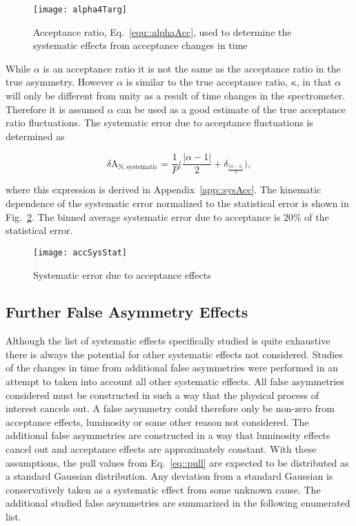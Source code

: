 \begin{figure}[h!t]
  \begin{center}
    \texttt{[image: alpha4Targ]}
    \caption{Acceptance ratio, Eq.~\ref{equ::alphaAcc}, used to determine the
      systematic effects from acceptance changes in time}
    \label{fig::alpha}
  \end{center}
\end{figure}

While $\alpha$ is an acceptance ratio it is not the same as the acceptance ratio
in the true asymmetry.  However $\alpha$ is similar to the true acceptance
ratio, $\kappa$, in that $\alpha$ will only be different from unity as a result
of time changes in the spectrometer.  Therefore it is assumed $\alpha$ can be
used as a good estimate of the true acceptance ratio fluctuations.  The
systematic error due to acceptance fluctuations is determined as

\begin{equation}
  \delta\mathrm{A}_{\mathrm{N,systematic}} =
  \frac{1}{P} \Big(\frac{|\alpha-1|}{2} + \delta_{\frac{|\alpha-1|}{2}} \Big),
\end{equation}

\noindent
where this expression is derived in Appendix~\ref{app::sysAcc}.  The kinematic
dependence of the systematic error normalized to the statistical error is shown
in Fig.~\ref{fig::accSysStat}.  The binned average systematic error due to
acceptance is 20\% of the statistical error.

\begin{figure}[h!t]
  \begin{center}
    \texttt{[image: accSysStat]}
    \caption{Systematic error due to acceptance effects}
    \label{fig::accSysStat}
  \end{center}
\end{figure}

\subsection{Further False Asymmetry Effects}
Although the list of systematic effects specifically studied is quite exhaustive
there is always the potential for other systematic effects not considered.
Studies of the changes in time from additional false asymmetries were performed
in an attempt to taken into account all other systematic effects.  All false
asymmetries considered must be constructed in such a way that the physical
process of interest cancels out.  A false asymmetry could therefore only be
non-zero from acceptance effects, luminosity or some other reason not
considered.  The additional false asymmetries are constructed in a way that
luminosity effects cancel out and acceptance effects are approximately constant.
With these assumptions, the pull values from Eq.~\ref{eq::pull} are expected to
be distributed as a standard Gaussian distribution.  Any deviation from a
standard Gaussian is conservatively taken as a systematic effect from some
unknown cause.  The additional studied false asymmetries are summarized in the
following enumerated list.

